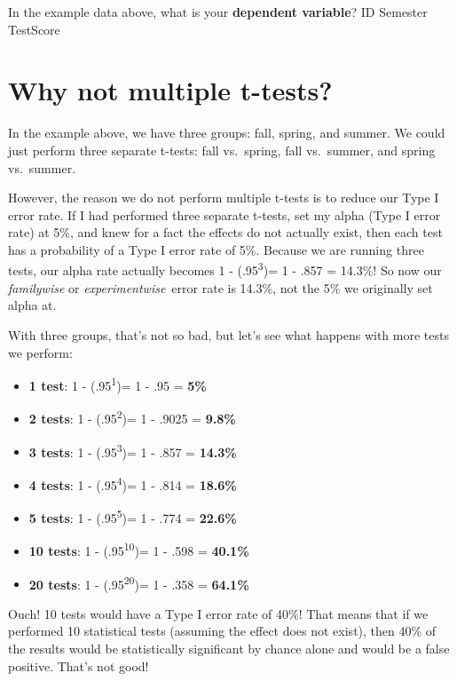 \documentclass[
]{book}
\providecommand{\tightlist}{%
  \setlength{\itemsep}{0pt}\setlength{\parskip}{0pt}}
\begin{document}
In the example data above, what is your \textbf{dependent variable}? ID Semester TestScore

\hypertarget{why-not-multiple-t-tests}{%
\section{Why not multiple t-tests?}\label{why-not-multiple-t-tests}}

In the example above, we have three groups: fall, spring, and summer. We could just perform three separate t-tests: fall vs.~spring, fall vs.~summer, and spring vs.~summer.

However, the reason we do not perform multiple t-tests is to reduce our Type I error rate. If I had performed three separate t-tests, set my alpha (Type I error rate) at 5\%, and knew for a fact the effects do not actually exist, then each test has a probability of a Type I error rate of 5\%. Because we are running three tests, our alpha rate actually becomes 1 - (.95\textsuperscript{3})= 1 - .857 = 14.3\%! So now our \emph{familywise} or \emph{experimentwise}~error rate is 14.3\%, not the 5\% we originally set alpha at.

With three groups, that's not so bad, but let's see what happens with more tests we perform:

\begin{itemize}
\tightlist
\item
  \textbf{1 test}: 1 - (.95\textsuperscript{1})= 1 - .95 = \textbf{5\%}
\item
  \textbf{2 tests}: 1 - (.95\textsuperscript{2})= 1 - .9025 = \textbf{9.8\%}
\item
  \textbf{3 tests}: 1 - (.95\textsuperscript{3})= 1 - .857 = \textbf{14.3\%}
\item
  \textbf{4 tests}: 1 - (.95\textsuperscript{4})= 1 - .814 = \textbf{18.6\%}
\item
  \textbf{5 tests}: 1 - (.95\textsuperscript{5})= 1 - .774 = \textbf{22.6\%}
\item
  \textbf{10 tests}: 1 - (.95\textsuperscript{10})= 1 - .598 = \textbf{40.1\%}
\item
  \textbf{20 tests}: 1 - (.95\textsuperscript{20})= 1 - .358 = \textbf{64.1\%}
\end{itemize}

Ouch! 10 tests would have a Type I error rate of 40\%! That means that if we performed 10 statistical tests (assuming the effect does not exist), then 40\% of the results would be statistically significant by chance alone and would be a false positive. That's not good!
\end{document}
